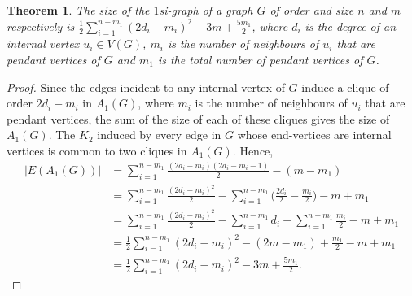 \documentclass[12pt,a4paper,twoside]{article}
\newtheorem{theorem}{Theorem}[section]
\theoremstyle{casesty}
\theoremstyle{subcasesty}
\theoremstyle{schemesty}
\begin{document}
\begin{theorem}
	The size of the $1$si-graph of a graph $G$ of order and size $n$ and $m$ respectively is $\frac{1}{2}\sum\limits_{i=1}^{n-m_{1}} (2d_{i}-m_{i})^2-3m+\frac{5m_{1}}{2}$, where $d_{i}$ is the degree of an internal vertex $u_{i}\in V(G)$, $m_{i}$ is the number of neighbours of $u_{i}$ that are pendant vertices of $G$ and $m_{1}$ is the total number of pendant vertices of $G$.
\end{theorem}
\begin{proof}
	Since the edges incident to any internal vertex of $G$ induce a clique of order $2d_{i}-m_{i}$ in $A_{1}(G)$, where $m_{i}$ is the number of neighbours of $u_{i}$ that are pendant vertices, the sum of the size of each of these cliques gives the size of $A_{1}(G)$. The $K_{2}$ induced by every edge in $G$ whose end-vertices are internal vertices is common to two cliques in $A_{1}(G)$. Hence, 
	\begin{equation*}
		\begin{split}
			|E(A_{1}(G))| &= \sum\limits_{i=1}^{n-m_{1}} \frac{(2d_{i}-m_{i})(2d_{i}-m_{i}-1)}{2}-(m-m_{1}) \\
			&=\sum\limits_{i=1}^{n-m_{1}} \frac{(2d_{i}-m_{i})^2}{2}-\sum\limits_{i=1}^{n-m_{1}} \Big (\frac{2d_{i}}{2}-\frac{m_{i}}{2} \Big) -m+m_{1}\\
			&=\sum\limits_{i=1}^{n-m_{1}} \frac{(2d_{i}-m_{i})^2}{2}-\sum\limits_{i=1}^{n-m_{1}} d_{i}+\sum\limits_{i=1}^{n-m_{1}}\frac{m_{i}}{2} -m+m_{1}\\
			&=\frac{1}{2}\sum\limits_{i=1}^{n-m_{1}} (2d_{i}-m_{i})^2-(2m-m_{1})+\frac{m_{1}}{2} -m+m_{1}\\
			&=\frac{1}{2}\sum\limits_{i=1}^{n-m_{1}} (2d_{i}-m_{i})^2-3m+\frac{5m_{1}}{2}.
		\end{split}
	\end{equation*} 
\end{proof}
\end{document}
